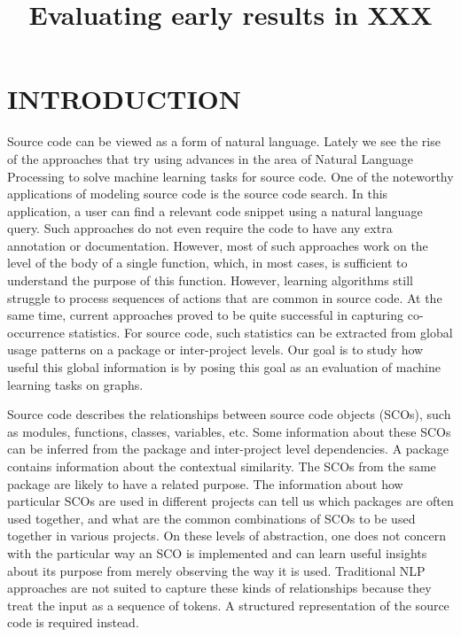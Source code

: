 \documentclass[a4paper,twoside]{article}
\begin{document}
\title{Evaluating early results in XXX}

\author{
}

\keywords{}

\abstract{
}

\onecolumn \maketitle \normalsize \setcounter{footnote}{0} \vfill

\section{\uppercase{Introduction}}
Source code can be viewed as a form of natural language. Lately we see the rise of the approaches that try using advances in the area of Natural Language Processing to solve machine learning tasks for source code. One of the noteworthy applications of modeling source code is the source code search. In this application, a user can find a relevant code snippet using a natural language query. Such approaches do not even require the code to have any extra annotation or documentation. However, most of such approaches work on the level of the body of a single function, which, in most cases, is sufficient to understand the purpose of this function. However, learning algorithms still struggle to process sequences of actions that are common in source code. At the same time, current approaches proved to be quite successful in capturing co-occurrence statistics. For source code, such statistics can be extracted from global usage patterns on a package or inter-project levels. Our goal is to study how useful this global information is by posing this goal as an evaluation of machine learning tasks on graphs.
 
Source code describes the relationships between source code objects (SCOs), such as modules, functions, classes, variables, etc. Some information about these SCOs can be inferred from the package and inter-project level dependencies. A package contains information about the contextual similarity. The SCOs from the same package are likely to have a related purpose. The information about how particular SCOs are used in different projects can tell us which packages are often used together, and what are the common combinations of SCOs to be used together in various projects. On these levels of abstraction, one does not concern with the particular way an SCO is implemented and can learn useful insights about its purpose from merely observing the way it is used. Traditional NLP approaches are not suited to capture these kinds of relationships because they treat the input as a sequence of tokens. A structured representation of the source code is required instead.
\end{document}
